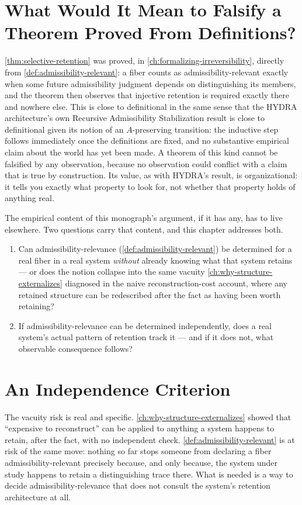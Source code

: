 \documentclass[11pt]{book}
\theoremstyle{plain}
\theoremstyle{definition}
\theoremstyle{remark}
\begin{document}
\section{What Would It Mean to Falsify a Theorem Proved From Definitions?}

\cref{thm:selective-retention} was proved, in
\cref{ch:formalizing-irreversibility}, directly from
\cref{def:admissibility-relevant}: a fiber counts as
admissibility-relevant exactly when some future admissibility
judgment depends on distinguishing its members, and the theorem then
observes that injective retention is required exactly there and
nowhere else. This is close to definitional in the same sense that
the HYDRA architecture's own Recursive Admissibility Stabilization
result is close to definitional given its notion of an
$A$-preserving transition: the inductive step follows immediately
once the definitions are fixed, and no substantive empirical claim
about the world has yet been made. A theorem of this kind cannot be
falsified by any observation, because no observation could conflict
with a claim that is true by construction. Its value, as with HYDRA's
result, is organizational: it tells you exactly what property to look
for, not whether that property holds of anything real.

The empirical content of this monograph's argument, if it has any, has
to live elsewhere. Two questions carry that content, and this chapter
addresses both.

\begin{enumerate}
\item Can admissibility-relevance (\cref{def:admissibility-relevant})
be determined for a real fiber in a real system \emph{without}
already knowing what that system retains --- or does the notion
collapse into the same vacuity \cref{ch:why-structure-externalizes}
diagnosed in the naive reconstruction-cost account, where any
retained structure can be redescribed after the fact as having been
worth retaining?
\item If admissibility-relevance can be determined independently,
does a real system's actual pattern of retention track it --- and if
it does not, what observable consequence follows?
\end{enumerate}

\section{An Independence Criterion}

The vacuity risk is real and specific. \cref{ch:why-structure-externalizes}
showed that \enquote{expensive to reconstruct} can be applied to
anything a system happens to retain, after the fact, with no
independent check. \cref{def:admissibility-relevant} is at risk of the
same move: nothing so far stops someone from declaring a fiber
admissibility-relevant precisely because, and only because, the system
under study happens to retain a distinguishing trace there. What is
needed is a way to decide admissibility-relevance that does not
consult the system's retention architecture at all.
\end{document}
